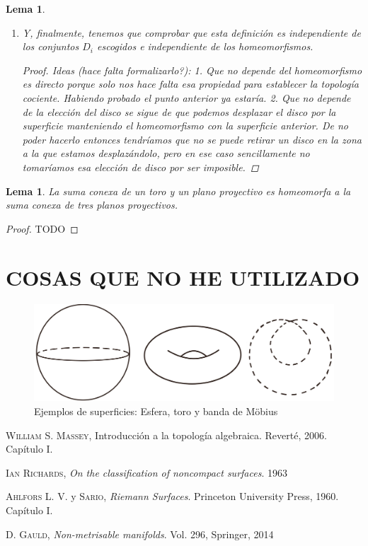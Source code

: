 \documentclass[a4paper,11pt,spanish, twoside, leqno]{tfg-uam}
\newtheorem{lema}[teor]{Lema}
\theoremstyle{definition}
\begin{document}
\begin{lema}
\begin{enumerate}
\begin{proof}
		\end{proof}
		\item 
		Y, finalmente, tenemos que comprobar que esta definición es independiente de los conjuntos $D_i$ escogidos e independiente de los homeomorfismos.
		\begin{proof}
			Ideas (hace falta formalizarlo?):
			1. Que no depende del homeomorfismo es directo porque solo nos hace falta esa propiedad para establecer la topología cociente. Habiendo probado el punto anterior ya estaría.
			2. Que no depende de la elección del disco se sigue de que podemos desplazar el disco por la superficie manteniendo el homeomorfismo con la superficie anterior. De no poder hacerlo entonces tendríamos que no se puede retirar un disco en la zona a la que estamos desplazándolo, pero en ese caso sencillamente no tomaríamos esa elección de disco por ser imposible.
		\end{proof}
	\end{enumerate} 
\end{lema}


\begin{lema}\label{lema:planop+toro=3planop}
La suma conexa de un toro y un plano proyectivo es homeomorfa a la suma conexa de tres planos proyectivos.
\end{lema}
\begin{proof}
TODO
\end{proof}





\chapter{COSAS QUE NO HE UTILIZADO}

\begin{figure}[h!]
	\centering
	\includegraphics[width=0.5\linewidth]{imagenes/superficies.png}
	\caption{Ejemplos de superficies: Esfera, toro y banda de M\"obius}
	\label{fig:superficies sencillas}
\end{figure} 





\begin{thebibliography}{10}
    \textsc{William S. Massey}, 
    Introducción a la topología algebraica. Reverté, 2006. Capítulo I.
    
    \textsc{Ian Richards},
    \textit{On the classification of noncompact surfaces}. 1963
    
    \textsc{Ahlfors L. V.} y \textsc{Sario},
    \textit{Riemann Surfaces}. Princeton University Press, 1960. Capítulo I.
    
    
   \textsc{D. Gauld}, \textit{Non-metrisable manifolds}. Vol. 296, Springer, 2014
    
\end{thebibliography}
\cleardoublepage
\end{document}
